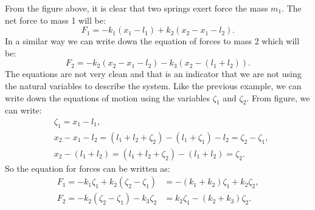 \documentclass[11pt,a4paper]{article}
\begin{document}
From the figure above, it is clear that two springs exert force the mass $m_1$. The net force to mass 1 will be:
\[  F_1 = -k_1 (x_1 - l_1) + k_2 (x_2 - x_1 - l_2). \] In a similar way we can write down the equation of forces to mass 2 which will be:
\[  F_2 = -k_2 (x_2 - x_1 - l_2) - k_3 (x_2 - (l_1 + l_2)). \] The equations are not very clean and that is an indicator that we are not using the natural variables to describe the system. Like the previous example, we can write down the equations of motion using the variables $\zeta_{1}$ and $\zeta_{2}$. From figure, we can write:
\begin{align*}
	& \zeta_1 = x_1 - l_1, \\
	& x_2 - x_1 - l_2 = (l_1 + l_2 + \zeta_{2}) - (l_1 + \zeta_{1}) - l_2 = \zeta_{2} - \zeta_{1},\\
	& x_2 - (l_1 + l_2) = (l_1 + l_2 + \zeta_{2}) - (l_1 + l_2)  = \zeta_{2}.
\end{align*}
So the equation for forces can be written as:
\begin{align*}
	F_1 = - k_1 \zeta_1 + k_2 (\zeta_2 - \zeta_1) &= -(k_1 + k_2)\zeta_1 + k_2 \zeta_2, \\
	F_2 = -k_2 (\zeta_2 - \zeta_1) - k_3 \zeta_2 &= k_2 \zeta_1 - (k_2 + k_3) \zeta_2.
\end{align*}
 
\end{document}
